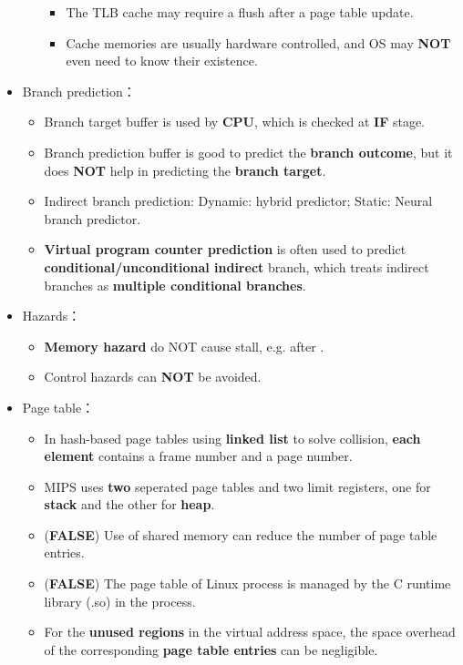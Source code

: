 \begin{itemize}
\begin{itemize}
\begin{itemize}
        \item The TLB cache may require a flush after a page table update.
        \item Cache memories are usually hardware controlled, and OS may \textbf{NOT} even need to know their existence.
    \end{itemize}
    \end{itemize}
    \item Branch prediction： \begin{itemize}
        \item Branch target buffer is used by \textbf{CPU}, which is checked at \textbf{IF} stage.
        \item Branch prediction buffer is good to predict the \textbf{branch outcome}, but it does \textbf{NOT} help in predicting the \textbf{branch target}.
        \item Indirect branch prediction: Dynamic: hybrid predictor; Static: Neural branch predictor.
        \item \textbf{Virtual program counter prediction} is often used to predict \textbf{conditional/unconditional indirect} branch, which treats indirect branches as \textbf{multiple conditional branches}.
    \end{itemize}
    \item Hazards： \begin{itemize}
        \item \textbf{Memory hazard} do NOT cause stall, e.g.  after .
        \item Control hazards can \textbf{NOT} be avoided.
    \end{itemize}
    \item Page table： \begin{itemize}
        \item In hash-based page tables using \textbf{linked list} to solve collision, \textbf{each element} contains a frame number and a page number.
        \item MIPS uses \textbf{two} seperated page tables and two limit registers, one for \textbf{stack} and the other for \textbf{heap}.
        \item (\textbf{FALSE}) Use of shared memory can reduce the number of page table entries.
        \item (\textbf{FALSE}) The page table of Linux process is managed by the C runtime library (.so) in the process.
        \item For the \textbf{unused regions} in the virtual address space, the space overhead of the corresponding \textbf{page table entries} can be negligible.

\end{itemize}
\end{itemize}
